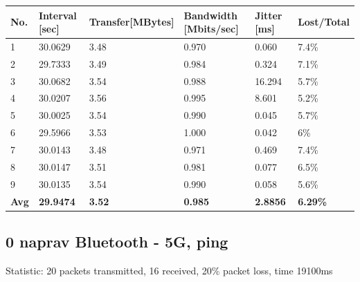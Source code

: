 \documentclass[11pt,a4paper,slovene]{article}
\begin{document}
\begin{table}[H]
	\begin{adjustwidth}{-3cm}{-3cm}
	\centering
		\begin{tabular}{l|l|l|l|l|l}
		\hline
		\textbf{No.} & \textbf{Interval [sec]} & \textbf{Transfer[MBytes]} & \textbf{Bandwidth [Mbits/sec]} & \textbf{Jitter [ms]} & \textbf{Lost/Total} \\
     	\hline
     	1 & 30.0629 & 3.48 & 0.970 & 0.060 & 7.4\% \\
  		2 & 29.7333 & 3.49 & 0.984 & 0.324 & 7.1\% \\
  		3 & 30.0682 & 3.54 & 0.988 & 16.294 & 5.7\% \\
  		4 & 30.0207 & 3.56 & 0.995 & 8.601 & 5.2\% \\
  		5 & 30.0025 & 3.54 & 0.990 & 0.045 & 5.7\% \\
  		6 & 29.5966 & 3.53 & 1.000 & 0.042 & 6\% \\
  		7 & 30.0143 & 3.48 & 0.971 & 0.469 & 7.4\% \\
  		8 & 30.0147 & 3.51 & 0.981 & 0.077 & 6.5\% \\
  		9 & 30.0135 & 3.54 & 0.990 & 0.058 & 5.6\% \\
  		\hline
  		\textbf{Avg} & \textbf{29.9474} & \textbf{3.52} & \textbf{0.985} & \textbf{2.8856} & \textbf{6.29\%} \\
  		\hline
    		\end{tabular}
    	\end{adjustwidth}
\end{table}

\subsection{0 naprav Bluetooth - 5G, ping}

Statistic: 20 packets transmitted, 16 received, 20\% packet loss, time 19100ms
 
\end{document}
